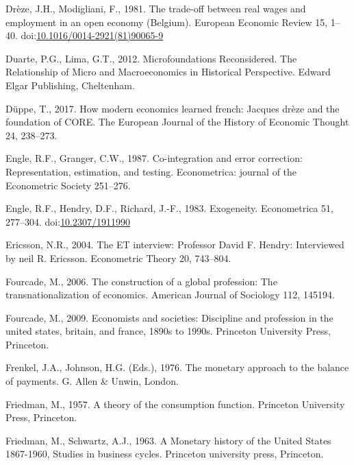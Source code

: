 \documentclass[
  12pt,
  onecolumn]{article}
\newlength{\cslhangindent}
\newlength{\cslentryspacingunit} %
\newenvironment{CSLReferences}[2] %
 {%
  \setlength{\parindent}{0pt}
  \ifodd #1
  \let\oldpar\par
  \def\par{\hangindent=\cslhangindent\oldpar}
  \fi
  \setlength{\parskip}{#2\cslentryspacingunit}
 }%
 {}
\begin{document}
\begin{CSLReferences}{1}{0}
\leavevmode{}%
Drèze, J.H., Modigliani, F., 1981. The trade-off between real wages and employment in an open economy ({Belgium}). European Economic Review 15, 1--40. doi:\href{https://doi.org/10.1016/0014-2921(81)90065-9}{10.1016/0014-2921(81)90065-9}

\leavevmode{}%
Duarte, P.G., Lima, G.T., 2012. Microfoundations {Reconsidered}. {The Relationship} of {Micro} and {Macroeconomics} in {Historical Perspective}. {Edward Elgar Publishing}, {Cheltenham}.

\leavevmode{}%
Düppe, T., 2017. How modern economics learned french: Jacques drèze and the foundation of CORE. The European Journal of the History of Economic Thought 24, 238--273.

\leavevmode{}%
Engle, R.F., Granger, C.W., 1987. Co-integration and error correction: Representation, estimation, and testing. Econometrica: journal of the Econometric Society 251--276.

\leavevmode{}%
Engle, R.F., Hendry, D.F., Richard, J.-F., 1983. Exogeneity. Econometrica 51, 277--304. doi:\href{https://doi.org/10.2307/1911990}{10.2307/1911990}

\leavevmode{}%
Ericsson, N.R., 2004. The {ET} interview: {Professor David F}. {Hendry}: {Interviewed} by neil {R}. {Ericsson}. Econometric Theory 20, 743--804.

\leavevmode{}%
Fourcade, M., 2006. The construction of a global profession: The transnationalization of economics. American Journal of Sociology 112, 145194.

\leavevmode{}%
Fourcade, M., 2009. Economists and societies: Discipline and profession in the united states, britain, and france, 1890s to 1990s. Princeton University Press, Princeton.

\leavevmode{}%
Frenkel, J.A., Johnson, H.G. (Eds.), 1976. The monetary approach to the balance of payments. {G. Allen \& Unwin}, {London}.

\leavevmode{}%
Friedman, M., 1957. A theory of the consumption function. Princeton University Press, Princeton.

\leavevmode{}%
Friedman, M., Schwartz, A.J., 1963. A {Monetary} history of the {United} {States} 1867-1960, Studies in business cycles. Princeton university press, Princeton.


\end{CSLReferences}
\end{document}
